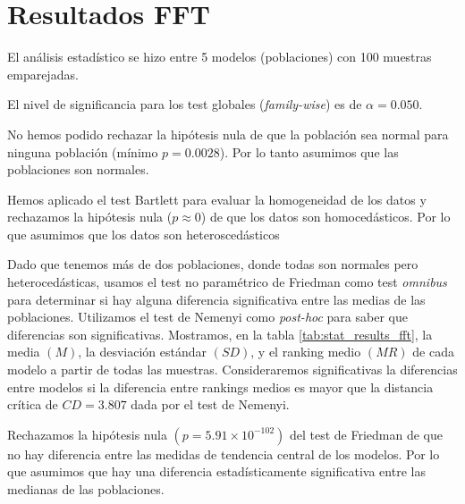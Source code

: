\documentclass[a4paper,oneside,11pt,leqno]{article}
\begin{document}
	\section{Resultados FFT}
	\label{sec:results_fft}

	El análisis estadístico se hizo entre 5 modelos (poblaciones) con 100 muestras emparejadas.

	El nivel de significancia para los test globales (\textit{family-wise}) es de $\alpha=0.050$.

	No hemos podido rechazar la hipótesis nula de que la población sea normal para ninguna población (mínimo $p=0.0028$). Por lo tanto asumimos que las poblaciones son normales.

	Hemos aplicado el test Bartlett para evaluar la homogeneidad de los datos y rechazamos la hipótesis nula ($p\approx 0$) de que los datos son homocedásticos. Por lo que asumimos que los datos son heteroscedásticos

	Dado que tenemos más de dos poblaciones, donde todas son normales pero heterocedásticas, usamos el test no paramétrico de Friedman como test \textit{omnibus} para determinar si hay alguna diferencia significativa entre las medias de las poblaciones. Utilizamos el test de Nemenyi como \textit{post-hoc} para saber que diferencias son significativas. Mostramos, en la tabla \ref{tab:stat_results_fft}, la media $(M)$, la desviación estándar $(SD)$, y el ranking medio $(MR)$ de cada modelo a partir de todas las muestras. Consideraremos significativas la diferencias entre modelos si la diferencia entre rankings medios es mayor que la distancia crítica de $CD=3.807$ dada por el test de Nemenyi.

	Rechazamos la hipótesis nula $(p=5.91\times 10^{-102})$ del test de Friedman de que no hay diferencia entre las medidas de tendencia central de los modelos. Por lo que asumimos que hay una diferencia estadísticamente significativa entre las medianas de las poblaciones.
\end{document}
